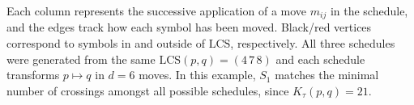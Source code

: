 \documentclass[sn-mathphys]{sn-jnl}
\DeclareMathOperator*{\argmin}{arg\,min}
\begin{document}
Each column represents the successive application of a move $m_{ij}$ in the schedule, 
and the edges track how each  symbol has been moved. 
Black/red vertices correspond to symbols in and outside of $\mathrm{LCS}$, respectively. 
All three schedules were generated from the same $\mathrm{LCS}(p,q) = (4\,7\,8)$ and each schedule transforms $p \mapsto q$ in $d = 6$ moves. 
In this example, $S_1$ matches the minimal number of crossings amongst all possible schedules,  since $K_\tau(p,q) = 21$. 
\\
\\
\end{document}
